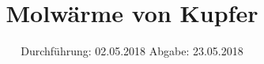 

\subject{VERSUCH NUMMER 47}
\title{Molwärme von Kupfer}
\date{
  Durchführung: 02.05.2018
  \hspace{3em}
  Abgabe: 23.05.2018
}



\thispagestyle{empty}
\maketitle
\thispagestyle{empty}
\tableofcontents
\newpage
\setcounter{page}{1}


% 




\nocite{*}
\printbibliography


